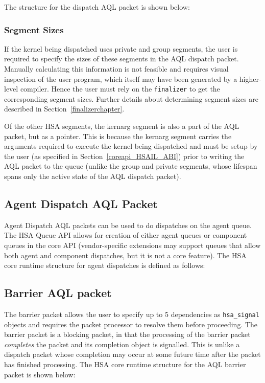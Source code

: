 The structure for the dispatch AQL packet is shown below:



\hypertarget{segment_sizes}{}\subsubsection{Segment
Sizes}\label{segment_sizes}
If the kernel being dispatched uses private and group segments, the
user is required to specify the sizes of these segments in the AQL
dispatch packet. Manually calculating this information is not 
feasible and requires visual inspection of the user program, which itself
may have been generated by a higher-level compiler. Hence the user
must rely on the \texttt{finalizer} to get the corresponding segment
sizes. Further details about determining segment sizes are described in
Section~\ref{finalizerchapter}.

Of the other HSA segments, the kernarg segment is also a part of
the AQL packet, but as a pointer. This is because the kernarg segment
carries the arguments required to execute the kernel being
dispatched and must be setup by the user (as specified in
Section~\ref{coreapi_HSAIL_ABI}) prior to writing the AQL packet to
the queue (unlike the group and private segments, whose lifespan
spans only the active state of the AQL dispatch packet).

\hypertarget{agent_packet}{}\subsection{Agent Dispatch AQL
Packet}\label{agent_packet}
Agent Dispatch AQL packets can be used to do dispatches on the agent
queue. The HSA Queue API allows for creation of either agent queues
or component queues in the core API (vendor-specific extensions may
support queues that allow both agent and component dispatches, but
it is not a core feature). The HSA core runtime structure for agent
dispatches is defined as follows:



\hypertarget{barrier_packet}{}\subsection{Barrier AQL
packet}\label{barrier_packet} 
The barrier packet allows the user to specify up to 5 dependencies
as \texttt{hsa\_signal} objects and requires the packet processor to
resolve them before proceeding. The barrier packet is a blocking
packet, in that the processing of the barrier packet
\emph{completes} the packet and its completion object is signalled.
This is unlike a dispatch packet whose completion may occur at some
future time after the packet has finished processing. The HSA core
runtime structure for the AQL barrier packet is shown below:

